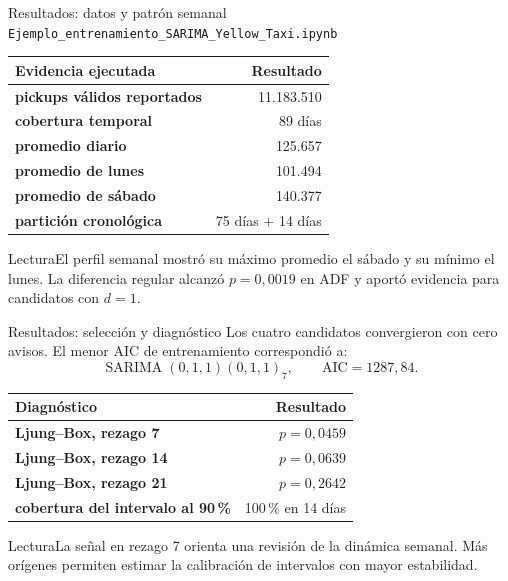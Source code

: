 \documentclass[aspectratio=169,10pt]{beamer}
\begin{document}
\begin{frame}{Resultados: datos y patrón semanal}\scriptsize
\texttt{Ejemplo\_entrenamiento\_SARIMA\_Yellow\_Taxi.ipynb}
\vspace{.35em}
\begin{tabularx}{\textwidth}{>{\bfseries}Xr}\toprule
Evidencia ejecutada & Resultado\\\midrule
pickups válidos reportados & 11.183.510\\
cobertura temporal & 89 días\\
promedio diario & 125.657\\
promedio de lunes & 101.494\\
promedio de sábado & 140.377\\
partición cronológica & 75 días + 14 días\\\bottomrule
\end{tabularx}
\begin{block}{Lectura}El perfil semanal mostró su máximo promedio el sábado y su mínimo el lunes. La diferencia regular alcanzó $p=0,0019$ en ADF y aportó evidencia para candidatos con $d=1$.\end{block}
\end{frame}

\begin{frame}{Resultados: selección y diagnóstico}\scriptsize
Los cuatro candidatos convergieron con cero avisos. El menor AIC de entrenamiento correspondió a:
\[\operatorname{SARIMA}(0,1,1)(0,1,1)_7,\qquad \mathrm{AIC}=1287,84.\]
\begin{tabularx}{\textwidth}{>{\bfseries}Xr}\toprule
Diagnóstico & Resultado\\\midrule
Ljung--Box, rezago 7 & $p=0,0459$\\
Ljung--Box, rezago 14 & $p=0,0639$\\
Ljung--Box, rezago 21 & $p=0,2642$\\
cobertura del intervalo al 90\,\% & 100\,\% en 14 días\\\bottomrule
\end{tabularx}
\begin{alertblock}{Lectura}La señal en rezago 7 orienta una revisión de la dinámica semanal. Más orígenes permiten estimar la calibración de intervalos con mayor estabilidad.\end{alertblock}
\end{frame}
\end{document}
